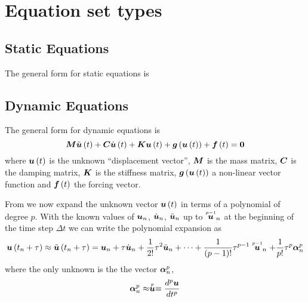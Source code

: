 \section{Equation set types}

\subsection{Static Equations}

The general form for static equations is

\subsection{Dynamic Equations}

The general form for dynamic equations is
\begin{equation}
  \matr{M}\fnof{\ddot{\vectr{u}}}{t}+\matr{C}\fnof{\dot{\vectr{u}}}{t}+\matr{K}\fnof{\vectr{u}}{t}+
  \fnof{\vectr{g}}{\fnof{\vectr{u}}{t}}+\fnof{\vectr{f}}{t}=\vectr{0}
  \label{eqn:generaldynamicnonlinear}
\end{equation}
where $ \boldsymbol{u}\left( t \right) $ is the unknown ``displacement vector'', $\matr{M}$
is the mass matrix, $\matr{C}$ is the damping matrix, $\matr{K}$ is the
stiffness matrix, $ \boldsymbol{g}\left(  \boldsymbol{u}\left( t \right)  \right) $ a non-linear vector
function and $ \boldsymbol{f}\left( t \right) $ the forcing vector.

From \cite{zienkiewicz:2006_1} we now expand the unknown vector $ \boldsymbol{u}\left( t \right) $ in terms of a polynomial of degree
$p$. With the known values of $\boldsymbol{u}_{n}$, $\dot{\boldsymbol{u}}_{n}$,
$\ddot{\boldsymbol{u}}_{n}$ up to $ \stackrel{\scriptscriptstyle p-1}{\boldsymbol{u}} _{n}$ at the beginning of
the time step $\Delta t$ we can write the polynomial expansion as
\begin{equation}
  \fnof{\vectr{u}}{t_{n}+\tau}\approx\fnof{\tilde{\vectr{u}}}{t_{n}+\tau}=\vectr{u}_{n}+\tau\dot{\vectr{u}}_{n}+
  \frac{1}{2!}\tau^{2}\ddot{\vectr{u}}_{n}+\cdots+\dfrac{1}{\factorial{p-1}}\tau^{p-1}\symover{p-1}{\vectr{u}}_{n}+
  \dfrac{1}{p!}\tau^{p}\vectr{\alpha}^{p}_{n}
  \label{eqn:timepolyexpansion}
\end{equation}
where the only unknown is the the vector $\boldsymbol{\alpha}^{p}_{n}$,
\begin{equation}
  \boldsymbol{\alpha}^{p}_{n}\approx \stackrel{\scriptscriptstyle p}{\boldsymbol{u}} \equiv \dfrac{ d^{p} \boldsymbol{u}}{d {t}^{p}} 
\end{equation}

